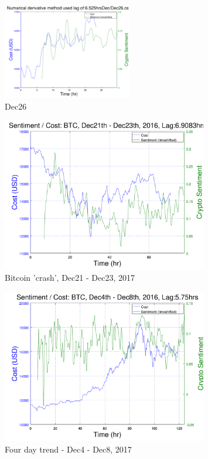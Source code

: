 \documentclass[12pt,journal,compsoc]{IEEEtran}
\begin{document}
\begin{figure}[h!]
	\centering
	\includegraphics[width=0.5\textwidth]{../Datasets/Plots/Dec26}
	\caption{Dec26}
	\label{fig:Dec26}
\end{figure}

\begin{figure}[h!]
	\centering
	\includegraphics[width=0.8\textwidth]{../Datasets/Plots/Dec21-23}
	\caption{Bitcoin 'crash', Dec21 - Dec23, 2017}
	\label{fig:Dec21-23}
\end{figure}

\begin{figure}[h!]
	\centering
	\includegraphics[width=0.8\textwidth]{../Datasets/Plots/Dec4-8}
	\caption{Four day trend - Dec4 - Dec8, 2017}
	\label{fig:Dec4-8}
\end{figure}
\end{document}
